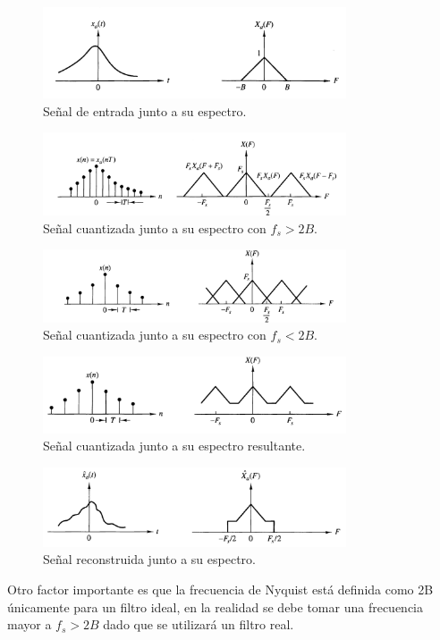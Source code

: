 \begin{figure}[H]
	\centering
	\includegraphics[width=0.8\textwidth]{ImagenesEjercicio2/aliassignal.PNG}
\caption{Señal de entrada junto a su espectro.}
	\label{fig:aliassingal}
\end{figure}

\begin{figure}[H]
	\centering
	\includegraphics[width=0.8\textwidth]{ImagenesEjercicio2/aliasquatum.PNG}
\caption{Señal cuantizada junto a su espectro con $f_s > 2B$.}
	\label{fig:aliasquantum}
\end{figure}
\begin{figure}[H]
	\centering
	\includegraphics[width=0.8\textwidth]{ImagenesEjercicio2/alias3.PNG}
\caption{Señal cuantizada junto a su espectro con $f_s < 2B$.}
	\label{fig:alias3}
\end{figure}
\begin{figure}[H]
	\centering
	\includegraphics[width=0.8\textwidth]{ImagenesEjercicio2/alias4.PNG}
\caption{Señal cuantizada junto a su espectro resultante.}
	\label{fig:alias4}
\end{figure}
\begin{figure}[H]
	\centering
	\includegraphics[width=0.8\textwidth]{ImagenesEjercicio2/aliasfin.PNG}
\caption{Señal reconstruida junto a su espectro.}
	\label{fig:aliasfin}
\end{figure}
Otro factor importante es que la frecuencia de Nyquist está definida como 2B únicamente para un filtro ideal, en la realidad se debe tomar una frecuencia mayor a $f_s>2B$ dado que se utilizará un filtro real.



